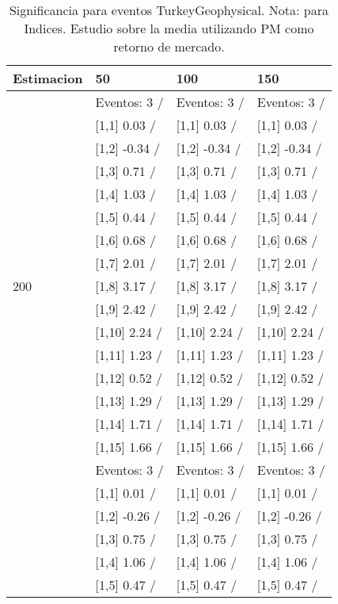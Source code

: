 \begin{table}

\caption{Significancia para eventos TurkeyGeophysical. Nota: para Indices. Estudio sobre la media utilizando PM como retorno de mercado.}
\centering
\begin{tabular}[t]{llll}
\toprule
Estimacion & 50 & 100 & 150\\
\midrule
 & Eventos:  3 / & Eventos:  3 / & Eventos:  3 /\\
 & {}[1,1] 0.03  / & {}[1,1] 0.03  / & {}[1,1] 0.03  /\\
 & {}[1,2] -0.34  / & {}[1,2] -0.34  / & {}[1,2] -0.34  /\\
 & {}[1,3] 0.71  / & {}[1,3] 0.71  / & {}[1,3] 0.71  /\\
 & {}[1,4] 1.03  / & {}[1,4] 1.03  / & {}[1,4] 1.03  /\\
\addlinespace
 & {}[1,5] 0.44  / & {}[1,5] 0.44  / & {}[1,5] 0.44  /\\
 & {}[1,6] 0.68  / & {}[1,6] 0.68  / & {}[1,6] 0.68  /\\
 & {}[1,7] 2.01  / & {}[1,7] 2.01  / & {}[1,7] 2.01  /\\
200 & {}[1,8] 3.17  / & {}[1,8] 3.17  / & {}[1,8] 3.17  /\\
 & {}[1,9] 2.42  / & {}[1,9] 2.42  / & {}[1,9] 2.42  /\\
\addlinespace
 & {}[1,10] 2.24  / & {}[1,10] 2.24  / & {}[1,10] 2.24  /\\
 & {}[1,11] 1.23  / & {}[1,11] 1.23  / & {}[1,11] 1.23  /\\
 & {}[1,12] 0.52  / & {}[1,12] 0.52  / & {}[1,12] 0.52  /\\
 & {}[1,13] 1.29  / & {}[1,13] 1.29  / & {}[1,13] 1.29  /\\
 & {}[1,14] 1.71  / & {}[1,14] 1.71  / & {}[1,14] 1.71  /\\
\addlinespace
 & {}[1,15] 1.66  / & {}[1,15] 1.66  / & {}[1,15] 1.66  /\\
 & Eventos:  3 / & Eventos:  3 / & Eventos:  3 /\\
 & {}[1,1] 0.01  / & {}[1,1] 0.01  / & {}[1,1] 0.01  /\\
 & {}[1,2] -0.26  / & {}[1,2] -0.26  / & {}[1,2] -0.26  /\\
 & {}[1,3] 0.75  / & {}[1,3] 0.75  / & {}[1,3] 0.75  /\\
\addlinespace
 & {}[1,4] 1.06  / & {}[1,4] 1.06  / & {}[1,4] 1.06  /\\
 & {}[1,5] 0.47  / & {}[1,5] 0.47  / & {}[1,5] 0.47  /\\

\end{tabular}
\end{table}
